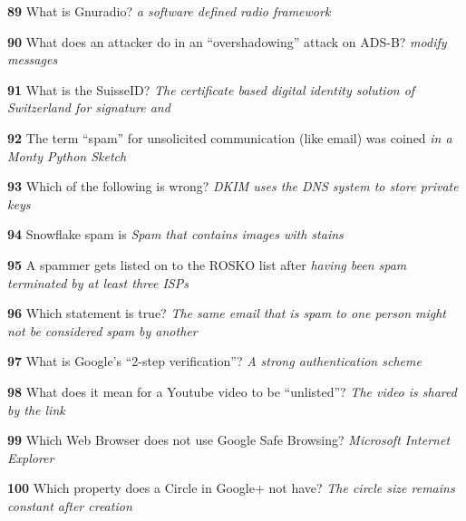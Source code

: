 \textbf{  89}  What is Gnuradio?  
\textit{ a software defined radio framework}

\textbf{  90}  What does an attacker do in an ``overshadowing'' attack on ADS-B?
\textit{ modify messages}

\textbf{  91}  What is the SuisseID?  
\textit{ The certificate based digital identity solution of Switzerland for signature and}

\textbf{  92}  The term ``spam'' for unsolicited communication (like email) was coined
\textit{ in a Monty Python Sketch}

\textbf{  93}  Which of the following is wrong?  
\textit{ DKIM uses the DNS system to store private keys}

\textbf{  94}  Snowflake spam is  
\textit{ Spam that contains images with stains}

\textbf{  95}  A spammer gets listed on to the ROSKO list after  
\textit{ having been spam terminated by at least three ISPs}

\textbf{  96}  Which statement is true?  
\textit{ The same email that is spam to one person might not be considered spam by another}

\textbf{  97}  What is Google's ``2-step verification''?
\textit{ A strong authentication scheme}

\textbf{  98}  What does it mean for a Youtube video to be ``unlisted''?
\textit{ The video is shared by the link}

\textbf{  99}  Which Web Browser does not use Google Safe Browsing?  
\textit{ Microsoft Internet Explorer}

\textbf{  100}  Which property does a Circle in Google+ not have? 
\textit{ The circle size remains constant after creation}
